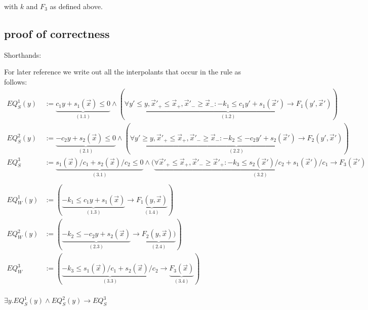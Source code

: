 \documentclass{llncs}
\begin{document}
with $k$ and $F_3$ as defined above.



\subsection{proof of correctness}

Shorthands: 

For later reference we write out all the interpolants that occur in the rule as follows:\\


\begin{align*}
EQ_S^1(y) & := \underbrace{c_{1}y+s_{1}(\vec x) \leq 0}_{(1.1)} \wedge 
( \underbrace{ \forall y'\leq y,\vec x'_+\leq \vec x_+, \vec x'_-\geq \vec x_-: -k_1 \leq c_{1}y'+s_{1}(\vec x')
\rightarrow F_1 (y',\vec x')}_{(1.2)} ) \\
EQ_S^2(y) & := \underbrace{-c_2 y+s_2(\vec x) \leq 0}_{(2.1)} \wedge 
( \underbrace{  \forall y'\geq y,\vec x'_+\leq \vec x_+, \vec x'_- \geq \vec x_-: -k_2 \leq -c_{2}y'+s_{2}(\vec x')
\rightarrow F_2 (y', \vec x')}_{(2.2)} ) \\
EQ_S^3 & := \underbrace{s_1(\vec x)/c_1 + s_2(\vec x)/c_2 \leq 0}_{(3.1)} \wedge 
( \underbrace{ \forall \vec x'_+\leq \vec x_+, \vec x'_- \geq \vec x'_+: -k_3 \leq s_2(\vec x')/c_2 + s_1(\vec x')/c_1
\rightarrow F_3(\vec x')}_{(3.2)} \\
& & \\
EQ_W^1(y) & := 
( \underbrace{ - k_1 \leq c_{1}y+s_{1}(\vec x)}_{(1.3)} \rightarrow
\underbrace{F_1 (y, \vec x)}_{(1.4)} ) \\
EQ_W^2(y) & := 
( \underbrace{- k_2 \leq -c_{2}y+s_{2}(\vec x)}_{(2.3)} \rightarrow
\underbrace{F_2 (y, \vec x))}_{(2.4)} ) \\
EQ_W^3 & := 
( \underbrace{ - k_3 \leq s_1(\vec x)/c_1 + s_2(\vec x)/c_2}_{(3.3)} \rightarrow 
\underbrace{F_3(\vec x)}_{(3.4)} ) \\
\end{align*}

\begin{lemma}\label{lemma_la1}
$\exists y. EQ_S^1(y) \wedge EQ_S^2(y) \rightarrow EQ_S^3$
\end{lemma}
\end{document}
